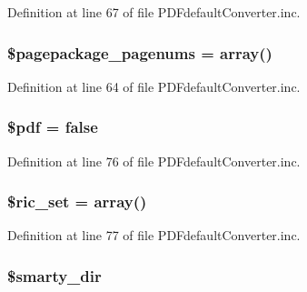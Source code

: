 \-Definition at line 67 of file \-P\-D\-Fdefault\-Converter.\-inc.

\hypertarget{class_p_d_fdefault_converter_aa99a4943236232e2e3ca6ac77bb1300a}{
\subsubsection[{\$pagepackage\-\_\-pagenums}]{\setlength{\rightskip}{0pt plus 5cm}\$pagepackage\-\_\-pagenums = array()}}\label{class_p_d_fdefault_converter_aa99a4943236232e2e3ca6ac77bb1300a}


\-Definition at line 64 of file \-P\-D\-Fdefault\-Converter.\-inc.

\hypertarget{class_p_d_fdefault_converter_a964ee5ee597c515cbb4dad2f14054cb4}{
\subsubsection[{\$pdf}]{\setlength{\rightskip}{0pt plus 5cm}\$pdf = false}}\label{class_p_d_fdefault_converter_a964ee5ee597c515cbb4dad2f14054cb4}


\-Definition at line 76 of file \-P\-D\-Fdefault\-Converter.\-inc.

\hypertarget{class_p_d_fdefault_converter_a84e3c5e32f1d02114c9d126d5864d06b}{
\subsubsection[{\$ric\-\_\-set}]{\setlength{\rightskip}{0pt plus 5cm}\$ric\-\_\-set = array()}}\label{class_p_d_fdefault_converter_a84e3c5e32f1d02114c9d126d5864d06b}


\-Definition at line 77 of file \-P\-D\-Fdefault\-Converter.\-inc.

\hypertarget{class_p_d_fdefault_converter_afc2adf23943f2cf6a93997e5ab9bca62}{
\subsubsection[{\$smarty\-\_\-dir}]{\setlength{\rightskip}{0pt plus 5cm}\$smarty\-\_\-dir}}\label{class_p_d_fdefault_converter_afc2adf23943f2cf6a93997e5ab9bca62}


